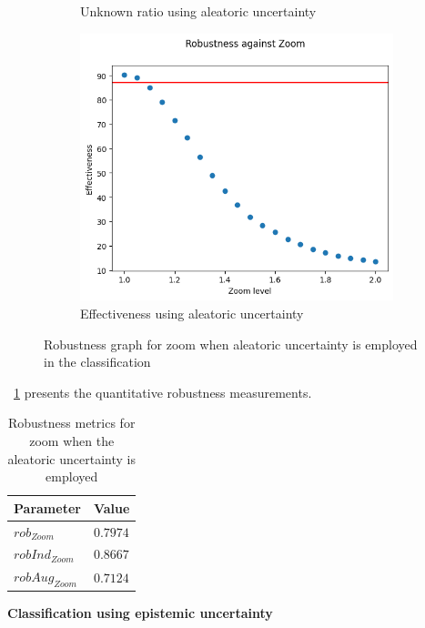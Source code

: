 \begin{figure}[h]
\begin{subfigure}{.33\textwidth}
		\caption{Unknown ratio using aleatoric uncertainty}
		\label{fig:zo_au_unkn}
	\end{subfigure}%
	\begin{subfigure}{.33\textwidth}
		\centering
		\includegraphics[width=0.9\linewidth]{ImageFiles/EvalBNN/ZO/AU/eff}
		\caption{Effectiveness using aleatoric uncertainty}
		\label{fig:zo_au_eff}
	\end{subfigure}
	\caption{Robustness graph for zoom when aleatoric uncertainty is employed in the classification}
	\label{fig:zo_au}
\end{figure}

\Tab~\ref{table:rob_zo_au} presents the quantitative robustness measurements.
\begin{table}[h]
	\centering
	\begin{tabular}{|| l | l ||} 
		\hline
		\textbf{Parameter} & \textbf{Value} \\
		\hline
		\hline
		$rob_{Zoom}$ & $0.7974$ \\
		$robInd_{Zoom}$ & $0.8667$ \\
		$robAug_{Zoom}$ & $0.7124$ \\	
		\hline
	\end{tabular}	
	\caption{Robustness metrics for zoom when the aleatoric uncertainty is employed}
	\label{table:rob_zo_au}
\end{table}

\vspace{0.3cm}
\textbf{Classification using epistemic uncertainty}
\vspace{0.1cm}


